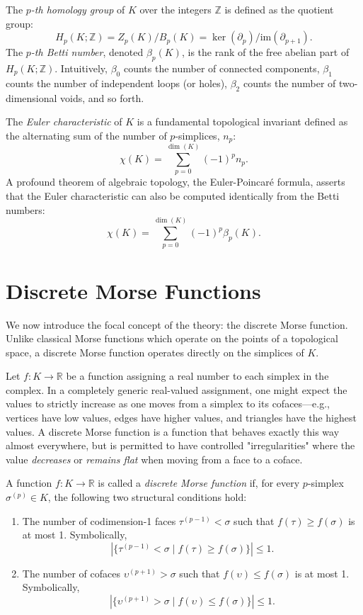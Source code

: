 The \emph{$p$-th homology group} of $K$ over the integers $\mathbb{Z}$ is defined as the quotient group:
\[ H_p(K; \mathbb{Z}) = Z_p(K) / B_p(K) = \ker(\partial_p) / \mathrm{im}(\partial_{p+1}). \]
The \emph{$p$-th Betti number}, denoted $\beta_p(K)$, is the rank of the free abelian part of $H_p(K; \mathbb{Z})$. Intuitively, $\beta_0$ counts the number of connected components, $\beta_1$ counts the number of independent loops (or holes), $\beta_2$ counts the number of two-dimensional voids, and so forth.

The \emph{Euler characteristic} of $K$ is a fundamental topological invariant defined as the alternating sum of the number of $p$-simplices, $n_p$:
\[ \chi(K) = \sum_{p=0}^{\dim(K)} (-1)^p n_p. \]
A profound theorem of algebraic topology, the Euler-Poincaré formula, asserts that the Euler characteristic can also be computed identically from the Betti numbers:
\[ \chi(K) = \sum_{p=0}^{\dim(K)} (-1)^p \beta_p(K). \]

\section{Discrete Morse Functions}

We now introduce the focal concept of the theory: the discrete Morse function. Unlike classical Morse functions which operate on the points of a topological space, a discrete Morse function operates directly on the simplices of $K$. 

Let $f : K \to \mathbb{R}$ be a function assigning a real number to each simplex in the complex. In a completely generic real-valued assignment, one might expect the values to strictly increase as one moves from a simplex to its cofaces—e.g., vertices have low values, edges have higher values, and triangles have the highest values. A discrete Morse function is a function that behaves exactly this way almost everywhere, but is permitted to have controlled "irregularities" where the value \emph{decreases} or \emph{remains flat} when moving from a face to a coface.

\begin{definition}
\label{def:discrete_morse_function}
A function $f : K \to \mathbb{R}$ is called a \emph{discrete Morse function} if, for every $p$-simplex $\sigma^{(p)} \in K$, the following two structural conditions hold:
\begin{enumerate}
    \item The number of codimension-1 faces $\tau^{(p-1)} < \sigma$ such that $f(\tau) \ge f(\sigma)$ is at most 1. Symbolically,
    \[ | \{ \tau^{(p-1)} < \sigma \mid f(\tau) \ge f(\sigma) \} | \le 1. \]
    \item The number of cofaces $\upsilon^{(p+1)} > \sigma$ such that $f(\upsilon) \le f(\sigma)$ is at most 1. Symbolically,
    \[ | \{ \upsilon^{(p+1)} > \sigma \mid f(\upsilon) \le f(\sigma) \} | \le 1. \]
\end{enumerate}
\end{definition}

